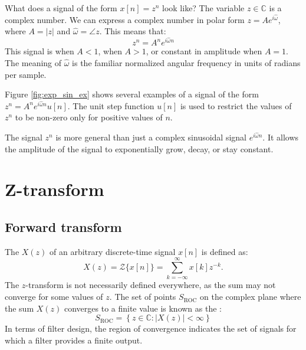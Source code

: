 What does a signal of the form $x[n]=z^n$ look like? The variable
$z\in \mathbb{C}$ is a complex number. We can express a complex number
in polar form $z=A e^{i\hat{\omega}}$, where $A=|z|$ and
$\hat{\omega} = \angle z$. This means that:
\begin{equation}
\boxed{
z^{n}=A^n e^{i \hat{\omega} n}
}
\end{equation}
This signal is 
when $A<1$,  when
$A>1$, or constant in amplitude when $A=1$. The meaning of
$\hat{\omega}$ is the familiar normalized angular frequency in units
of radians per sample.

Figure \ref{fig:exp_sin_ex} shows several examples of a signal of the
form $z^{n}=A^n e^{i \hat{\omega} n} u[n]$. The unit step function
$u[n]$ is used to restrict the values of $z^n$ to be non-zero
only for positive values of $n$.

The signal $z^{n}$ is more general than just a complex sinusoidal
signal $e^{i \hat{\omega} n}$. It allows the amplitude of the signal to
exponentially grow, decay, or stay constant.
 

\section{Z-transform}
\usetikzlibrary{arrows,positioning} 

\subsection*{Forward transform}
The  $X(z)$ of an arbitrary discrete-time signal $x[n]$ is
defined as:
\begin{equation}
\boxed{
X(z) = \mathcal{Z}\{x[n]\} = \sum_{k=-\infty}^{\infty} x[k] z^{-k}.}
\label{zf}
\end{equation}
The $z$-transform is not necessarily defined everywhere, as the sum
may not converge for some values of $z$. The set of points
$S_{\mathrm{ROC}}$ on the complex plane where the sum $X(z)$ converges
to a finite value is known as the \emph{}:
\begin{equation}
S_{\mathrm{ROC}} = \left\{z \in \mathbb{C} :  |X(z)| < \infty\right\}
\end{equation}
In terms of filter design, the region of convergence indicates the set
of signals for which a filter provides a finite output. 

